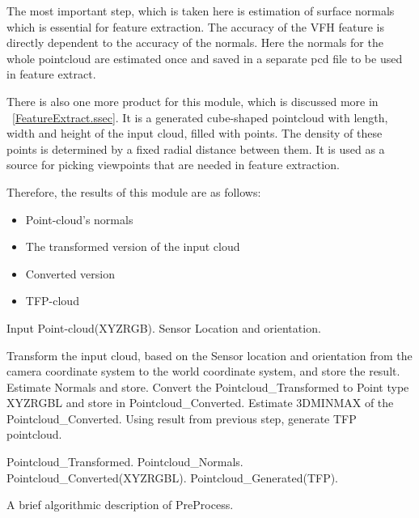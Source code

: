  The most important step, which is taken here is estimation of surface normals which is essential for feature extraction. 
 The accuracy of the VFH feature is directly dependent to the accuracy of the normals. 
 Here the normals for the whole pointcloud are estimated once and saved in a separate pcd file to be used in 
 feature extract. 
 
 There is also one more product for this module, which is discussed more in ~\ref{FeatureExtract.ssec}.
 It is a generated cube-shaped pointcloud with length, width and height of the input cloud, filled with points.
 The density of these points is determined by a fixed radial distance between them.
 It is used as a source for picking viewpoints that are needed in feature extraction.
 
 Therefore, the results of this module are as follows:
 \begin{itemize}
  \item Point-cloud's normals
  \item The transformed version of the input cloud
  \item Converted version
  \item TFP-cloud
 \end{itemize}
 
\begin{algorithm}[t]
\begin{algorithmic}[1]
\REQUIRE Input Point-cloud(XYZRGB).
\REQUIRE Sensor Location and orientation.
\medskip

\STATE Transform the input cloud, based on the Sensor location and orientation from the camera coordinate system to the world coordinate system, and store the 
result.
\STATE Estimate Normals and store.
\STATE Convert the Pointcloud\_Transformed to Point type XYZRGBL and store in Pointcloud\_Converted.
\STATE Estimate 3DMINMAX of the Pointcloud\_Converted.
\STATE Using result from previous step, generate TFP pointcloud.

\medskip
\ENSURE Pointcloud\_Transformed.
\ENSURE Pointcloud\_Normals.
\ENSURE Pointcloud\_Converted(XYZRGBL).
\ENSURE Pointcloud\_Generated(TFP).

\end{algorithmic}
\caption[PreProcess.]
{A brief algorithmic description of PreProcess.}
\label{Preprocess.algorithm}
\end{algorithm}



